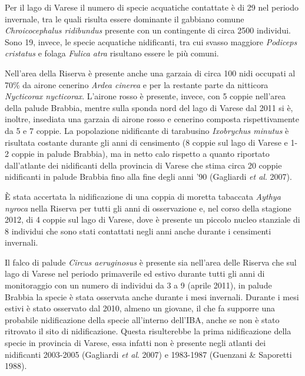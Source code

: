 Per il lago di Varese il numero di specie acquatiche contattate \`e di
29 nel periodo invernale, tra le quali risulta essere dominante il
gabbiano comune \textit{Chroicocephalus ridibundus} presente con un
contingente di circa 2500 individui. Sono 19, invece, le specie
acquatiche nidificanti, tra cui svasso maggiore \textit{Podiceps
cristatus} e folaga \textit{Fulica atra} risultano essere le pi\`u
comuni.

Nell{\textquoteright}area della Riserva \`e presente anche una garzaia
di circa 100 nidi occupati al 70\% da airone cenerino \textit{Ardea
cinerea} e per la restante parte da nitticora \textit{Nycticorax
nycticorax}. L{\textquoteright}airone rosso \`e presente, invece, con 5
coppie nell{\textquoteright}area della palude Brabbia, mentre sulla
sponda nord del lago di Varese dal 2011 si \`e, inoltre, insediata una
garzaia di airone rosso e cenerino composta rispettivamente da 5 e 7
coppie. La popolazione nidificante di tarabusino \textit{Ixobrychus
minutus} \`e risultata costante durante gli anni di censimento (8
coppie sul lago di Varese e 1-2 coppie in palude Brabbia), ma in netto
calo rispetto a quanto riportato dall{\textquoteright}atlante dei
nidificanti della provincia di Varese che stima circa 20 coppie
nidificanti in palude Brabbia fino alla fine degli anni
{\textquoteright}90 (Gagliardi \textit{et al}. 2007). 

\`E stata accertata la nidificazione di una coppia di moretta tabaccata
\textit{Aythya nyroca} nella Riserva per tutti gli anni di osservazione
e, nel corso della stagione 2012, di 4 coppie sul lago di Varese, dove
\`e presente un piccolo nucleo stanziale di 8 individui che sono stati
contattati negli anni anche durante i censimenti invernali. 

Il falco di palude \textit{Circus aeruginosus} \`e presente sia
nell{\textquoteright}area delle Riserva che sul lago di Varese nel
periodo primaverile ed estivo durante tutti gli anni di monitoraggio
con un numero di individui da 3 a 9 (aprile 2011), in palude Brabbia la
specie \`e stata osservata anche durante i mesi invernali. Durante i
mesi estivi \`e stato osservato dal 2010, almeno un giovane, il che fa
supporre una probabile nidificazione della specie
all{\textquoteright}interno dell{\textquoteright}IBA, anche se non \`e
stato ritrovato il sito di nidificazione. Questa risulterebbe la prima
nidificazione della specie in provincia di Varese, essa infatti non \`e
presente negli atlanti dei nidificanti 2003-2005 (Gagliardi \textit{et
al}. 2007) e 1983-1987 (Guenzani \& Saporetti 1988).

